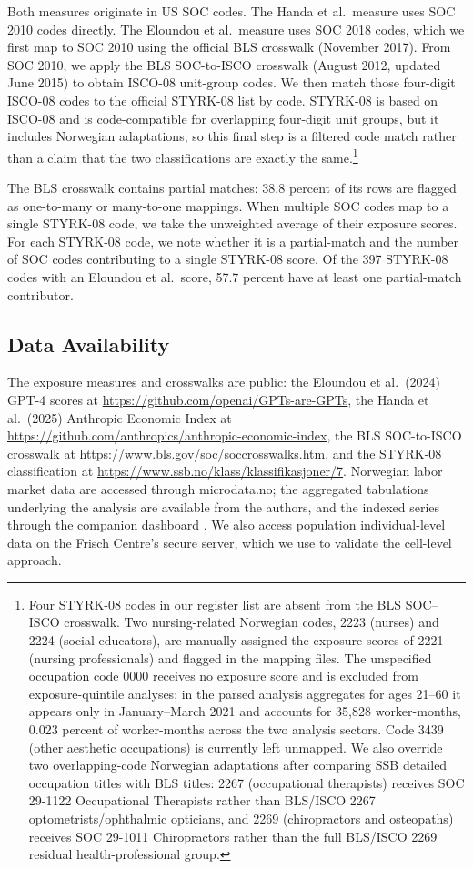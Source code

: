 \documentclass[12pt]{article}
\begin{document}
Both measures originate in US SOC codes. The Handa et al.\ measure uses SOC 2010 codes directly. The Eloundou et al.\ measure uses SOC 2018 codes, which we first map to SOC 2010 using the official BLS crosswalk (November 2017). From SOC 2010, we apply the BLS SOC-to-ISCO crosswalk (August 2012, updated June 2015) to obtain ISCO-08 unit-group codes. We then match those four-digit ISCO-08 codes to the official STYRK-08 list by code. STYRK-08 is based on ISCO-08 and is code-compatible for overlapping four-digit unit groups, but it includes Norwegian adaptations, so this final step is a filtered code match rather than a claim that the two classifications are exactly the same.\footnote{Four STYRK-08 codes in our register list are absent from the BLS SOC--ISCO crosswalk. Two nursing-related Norwegian codes, 2223 (nurses) and 2224 (social educators), are manually assigned the exposure scores of 2221 (nursing professionals) and flagged in the mapping files. The unspecified occupation code 0000 receives no exposure score and is excluded from exposure-quintile analyses; in the parsed analysis aggregates for ages 21--60 it appears only in January--March 2021 and accounts for 35,828 worker-months, 0.023 percent of worker-months across the two analysis sectors. Code 3439 (other aesthetic occupations) is currently left unmapped. We also override two overlapping-code Norwegian adaptations after comparing SSB detailed occupation titles with BLS titles: 2267 (occupational therapists) receives SOC 29-1122 Occupational Therapists rather than BLS/ISCO 2267 optometrists/ophthalmic opticians, and 2269 (chiropractors and osteopaths) receives SOC 29-1011 Chiropractors rather than the full BLS/ISCO 2269 residual health-professional group.}

The BLS crosswalk contains partial matches: 38.8 percent of its rows are flagged as one-to-many or many-to-one mappings. When multiple SOC codes map to a single STYRK-08 code, we take the unweighted average of their exposure scores. For each STYRK-08 code, we note whether it is a partial-match and the number of SOC codes contributing to a single STYRK-08 score. Of the 397 STYRK-08 codes with an Eloundou et al.\ score, 57.7 percent have at least one partial-match contributor.


\subsection*{Data Availability}

The exposure measures and crosswalks are public: the Eloundou et al.\ (2024) GPT-4 scores at \url{https://github.com/openai/GPTs-are-GPTs}, the Handa et al.\ (2025) Anthropic Economic Index at \url{https://github.com/anthropics/anthropic-economic-index}, the BLS SOC-to-ISCO crosswalk at \url{https://www.bls.gov/soc/soccrosswalks.htm}, and the STYRK-08 classification at \url{https://www.ssb.no/klass/klassifikasjoner/7}. Norwegian labor market data are accessed through microdata.no; the aggregated tabulations underlying the analysis are available from the authors, and the indexed series through the companion dashboard \citep{kiindeksen2026}. We also access population individual-level data on the Frisch Centre's secure server, which we use to validate the cell-level approach. 
\end{document}
